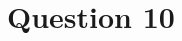 \documentclass[11pt,notitlepage]{article}\usepackage[]{graphicx}\usepackage[]{color}
\makeatletter
\newenvironment{kframe}{%
 \def\at@end@of@kframe{}%
 \ifinner\ifhmode%
  \def\at@end@of@kframe{\end{minipage}}%
  \begin{minipage}{\columnwidth}%
 \fi\fi%
 \def\FrameCommand##1{\hskip\@totalleftmargin \hskip-\fboxsep
 \colorbox{shadecolor}{##1}\hskip-\fboxsep
     \hskip-\linewidth \hskip-\@totalleftmargin \hskip\columnwidth}%
 \MakeFramed {\advance\hsize-\width
   \@totalleftmargin\z@ \linewidth\hsize
   \@setminipage}}%
 {\par\unskip\endMakeFramed%
 \at@end@of@kframe}
\newenvironment{knitrout}{}{} %
\makeatother
\begin{document}
\section*{Question 10}
\begin{knitrout}
\color{fgcolor}\begin{kframe}
\begin{verbatim}





\end{verbatim}
\end{kframe}
\end{knitrout}
\end{document}
